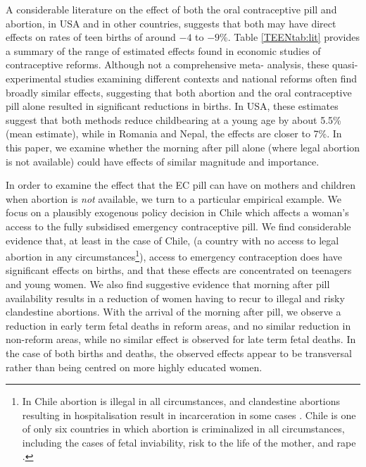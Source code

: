 
A considerable literature on the effect of both the oral contraceptive pill
and abortion, in USA and in other countries, suggests that both may have direct
effects on rates of teen births of around $-4$ to $-9$\%.  Table
\ref{TEENtab:lit} provides a summary of the range of estimated effects found in
economic studies of contraceptive reforms.  Although not a comprehensive meta-%
analysis, these quasi-experimental studies examining different contexts and
national reforms often find broadly similar effects, suggesting that both
abortion and the oral contraceptive pill alone resulted in significant 
reductions in births. In USA, these estimates suggest that both methods reduce 
childbearing at a young age by about 5.5\% (mean estimate), while in Romania 
and Nepal, the effects are closer to 7\%.  In this paper, we examine whether the 
morning after pill alone (where legal abortion is not available) could have 
effects of similar magnitude and importance.

In order to examine the effect that the EC pill can have on mothers and children 
when abortion is \emph{not} available, we turn to a particular empirical example.  
We focus on a plausibly exogenous policy decision in Chile which affects a 
woman's access to the fully subsidised emergency contraceptive pill.  We find 
considerable evidence that, at least in the case of Chile, (a country with no 
access to legal abortion in any circumstances\footnote{In Chile abortion is 
illegal in all circumstances, and clandestine abortions resulting in 
hospitalisation result in incarceration in some cases \citep{ShepardCasas2007}.  
Chile is one of only six countries in which abortion is criminalized in all 
circumstances, including the cases of fetal inviability, risk to the life of the 
mother, and rape \citep{UN2014}.}), access to emergency contraception does have 
significant effects on births, and that these effects are concentrated on 
teenagers and young women.  We also find suggestive evidence that morning after 
pill availability results in a reduction of women having to recur to illegal and 
risky clandestine abortions.  With the arrival of the morning after pill, we 
observe a reduction in early term fetal deaths in reform areas, and no similar 
reduction in non-reform areas, while no similar effect is observed for late term 
fetal deaths.  In the case of both births and deaths, the observed effects appear 
to be transversal rather than being centred on more highly educated women.

